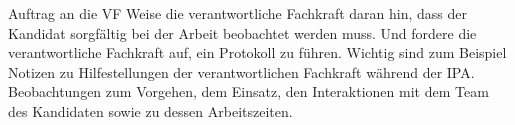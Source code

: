 \begin{taskitemwithoutcomment}{Auftrag an die VF}
  Weise die verantwortliche Fachkraft daran hin, dass der Kandidat sorgfältig bei der Arbeit beobachtet werden muss. Und fordere die verantwortliche Fachkraft auf, ein Protokoll zu führen. Wichtig sind zum Beispiel Notizen zu Hilfestellungen der verantwortlichen Fachkraft während der IPA. Beobachtungen zum Vorgehen, dem Einsatz, den Interaktionen mit dem Team des Kandidaten sowie zu dessen Arbeitszeiten.
\end{taskitemwithoutcomment}
